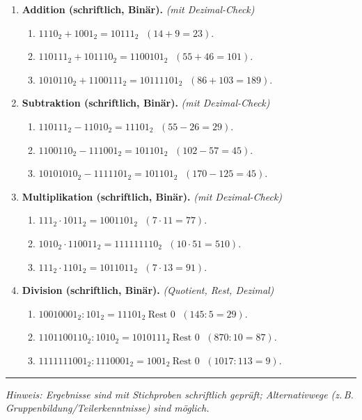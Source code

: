 \documentclass[11pt,a4paper]{scrartcl}
\begin{document}
	\begin{enumerate}[leftmargin=*,label=\textbf{Aufgabe~\arabic*:}, itemsep=0.9em, start=1]
		
		\item \textbf{Addition (schriftlich, Binär).} \emph{(mit Dezimal-Check)}
		\begin{enumerate}[label*=\alph*)]
			\item \(1110_2 + 1001_2 = \boxed{10111_2}\) \(\;(14+9=23)\).
			\item \(110111_2 + 101110_2 = \boxed{1100101_2}\) \(\;(55+46=101)\).
			\item \(1010110_2 + 1100111_2 = \boxed{10111101_2}\) \(\;(86+103=189)\).
		\end{enumerate}
		
		\item \textbf{Subtraktion (schriftlich, Binär).} \emph{(mit Dezimal-Check)}
		\begin{enumerate}[label*=\alph*)]
			\item \(110111_2 - 11010_2 = \boxed{11101_2}\) \(\;(55-26=29)\).
			\item \(1100110_2 - 111001_2 = \boxed{101101_2}\) \(\;(102-57=45)\).
			\item \(10101010_2 - 1111101_2 = \boxed{101101_2}\) \(\;(170-125=45)\).
		\end{enumerate}
		
		\item \textbf{Multiplikation (schriftlich, Binär).} \emph{(mit Dezimal-Check)}
		\begin{enumerate}[label*=\alph*)]
			\item \(111_2 \cdot 1011_2 = \boxed{1001101_2}\) \(\;(7\cdot 11=77)\).
			\item \(1010_2 \cdot 110011_2 = \boxed{111111110_2}\) \(\;(10\cdot 51=510)\).
			\item \(111_2 \cdot 1101_2 = \boxed{1011011_2}\) \(\;(7\cdot 13=91)\).
		\end{enumerate}
		
		\item \textbf{Division (schriftlich, Binär).} \emph{(Quotient, Rest, Dezimal)}
		\begin{enumerate}[label*=\alph*)]
			\item \(10010001_2 : 101_2 = \boxed{11101_2}\ \text{Rest } \boxed{0}\) \(\;(145:5=29)\).
			\item \(1101100110_2 : 1010_2 = \boxed{1010111_2}\ \text{Rest } \boxed{0}\) \(\;(870:10=87)\).
			\item \(1111111001_2 : 1110001_2 = \boxed{1001_2}\ \text{Rest } \boxed{0}\) \(\;(1017:113=9)\).
		\end{enumerate}
		
	\end{enumerate}
	
	\vfill
	\hrule
	\small\emph{Hinweis: Ergebnisse sind mit Stichproben schriftlich geprüft; Alternativwege (z.\,B. Gruppenbildung/Teilerkenntnisse) sind möglich.}
	
\end{document}
